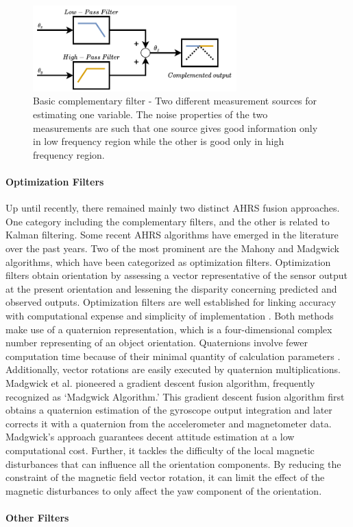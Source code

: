 \begin{figure}[!h]
    \centering
    \includegraphics[width=0.7\textwidth]{figures/complementary.pdf}
    \caption{Basic complementary filter \cite{higgins1975comparison} - Two different measurement sources for estimating one variable. The noise properties of the two measurements are such that one source gives good information only in low frequency region while the other is good only in high frequency region. }
    \label{fig:complementary}
\end{figure}

\paragraph{Optimization Filters}

Up until recently, there remained mainly two distinct AHRS fusion approaches. One category including the complementary filters, and the other is related to Kalman filtering. Some recent AHRS algorithms have emerged in the literature over the past years. Two of the most prominent are the Mahony and Madgwick algorithms, which have been categorized as optimization filters. Optimization filters obtain orientation by assessing a vector representative of the sensor output at the present orientation and lessening the disparity concerning predicted and observed outputs. Optimization filters are well established for linking accuracy with computational expense and simplicity of implementation \cite{madgwick2020extended}.
Both methods make use of a quaternion representation, which is a four-dimensional complex number representing of an object orientation. Quaternions involve fewer computation time because of their minimal quantity of calculation parameters \cite{ludwig2018comparison}. Additionally, vector rotations are easily executed by quaternion multiplications.
Madgwick et al. \cite{madgwick2010efficient} pioneered a gradient descent fusion algorithm, frequently recognized as ‘Madgwick Algorithm.’ This gradient descent fusion algorithm first obtains a quaternion estimation of the gyroscope output integration and later corrects it with a quaternion from the accelerometer and magnetometer data. Madgwick’s approach guarantees decent attitude estimation at a low computational cost. Further, it tackles the difficulty of the local magnetic disturbances that can influence all the orientation components. By reducing the constraint of the magnetic field vector rotation, it can limit the effect of the magnetic disturbances to only affect the yaw component of the orientation.

\paragraph{Other Filters}
